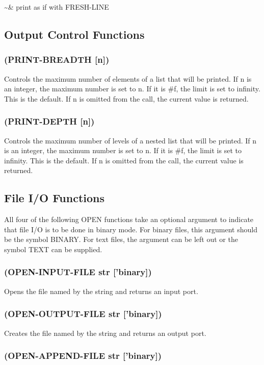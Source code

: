 \documentclass[11pt]{article}
\begin{document}
\textasciitilde{}\& print as if with FRESH-LINE
\subsection{Output Control Functions}
\label{sec-4-36}

\subsubsection{(PRINT-BREADTH [n])}
\label{sec-4-36-1}

Controls the maximum number of elements of a list that will be
printed.  If n is an integer, the maximum number is set to n.  If it
is \#f, the limit is set to infinity.  This is the default.  If n is
omitted from the call, the current value is returned.
\subsubsection{(PRINT-DEPTH [n])}
\label{sec-4-36-2}

Controls the maximum number of levels of a nested list that will be
printed.  If n is an integer, the maximum number is set to n.  If it
is \#f, the limit is set to infinity.  This is the default.  If n is
omitted from the call, the current value is returned.
\subsection{File I/O Functions}
\label{sec-4-37}

All four of the following OPEN functions take an optional argument to
indicate that file I/O is to be done in binary mode.  For binary
files, this argument should be the symbol BINARY.  For text files, the
argument can be left out or the symbol TEXT can be supplied.

\subsubsection{(OPEN-INPUT-FILE str ['binary])}
\label{sec-4-37-1}

Opens the file named by the string and returns an input port.
\subsubsection{(OPEN-OUTPUT-FILE str ['binary])}
\label{sec-4-37-2}

Creates the file named by the string and returns an output port.
\subsubsection{(OPEN-APPEND-FILE str ['binary])}
\label{sec-4-37-3}
\end{document}
